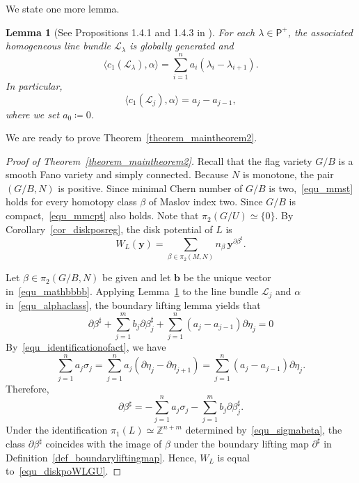 \documentclass[11pt]{amsart}
\theoremstyle{plain}
\newtheorem{lemma}[theorem]{Lemma}
\theoremstyle{definition}
\theoremstyle{remark}
\newcommand{\Z}{\mathbb{Z}}
\numberwithin{equation}{section} \numberwithin{table}{section}
\numberwithin{equation}{section}
\begin{document}
We state one more lemma.

\begin{lemma}[See Propositions 1.4.1 and 1.4.3 in \cite{Bri04}] \label{lemma_chernnumbercal}
For each $\lambda \in \mathsf{P}^+$, the associated homogeneous line bundle $\mathcal{L}_\lambda$ is globally generated and
$$
\langle c_1(\mathcal{L}_\lambda) , \alpha \rangle = \sum_{i=1}^n a_i (\lambda_i - \lambda_{i+1}).
$$
In particular, 
$$
\langle c_1(\mathcal{L}_j) , \alpha \rangle = a_j - a_{j-1},
$$
where we set $a_0 \coloneqq 0$.
\end{lemma}

We are ready to prove Theorem~\ref{theorem_maintheorem2}.

\begin{proof}[Proof of Theorem~\ref{theorem_maintheorem2}]
Recall that the flag variety $G/B$ is a smooth Fano variety and simply connected. Because $N$ is monotone, the pair $(G/B, N)$ is positive. Since minimal Chern number of $G/B$ is two,~\eqref{equ_mmst} holds for every homotopy class $\beta$ of Maslov index two. Since $G/B$ is compact,~\eqref{equ_mmcpt} also holds. Note that $\pi_2(G/U) \simeq \{0\}$. By Corollary~\ref{cor_diskposreg}, the disk potential of $L$ is 
$$
W_L (\mathbf{y}) = \sum_{\beta \in \pi_2(M,N)} n_\beta \, \mathbf{y}^{\partial \beta^\sharp}.
$$

Let $\beta\in\pi_2(G/B,N)$ be given and let $\mathbf{b}$ be the unique vector in~\eqref{equ_mathbbbb}. Applying Lemma~\ref{lemma_chernnumbercal} to the line bundle $\mathcal{L}_j$ and $\alpha$ in~\eqref{equ_alphaclass}, the boundary lifting lemma yields that
$$
\partial \beta^\sharp + \sum_{j=1}^m b_j \partial \beta_j^\sharp + \sum_{j=1}^{n} (a_j - a_{j-1}) \partial \eta_j = 0
$$
By~\eqref{equ_identificationofact}, we have
$$
\sum_{j=1}^n a_j \sigma_j = \sum_{j=1}^n a_j (\partial \eta_{j} - \partial \eta_{j+1}) =   \sum_{j=1}^{n} (a_j - a_{j-1}) \partial \eta_j.
$$
Therefore, 
\begin{equation}\label{equ_linearcomofpartialbeta}
\partial \beta^\sharp = - \sum_{j=1}^n a_j \sigma_j - \sum_{j=1}^m b_j \partial \beta_j^\sharp.
\end{equation}
Under the identification $\pi_1(L) \simeq \Z^{n+m}$ determined by~\eqref{equ_sigmabeta}, the class $\partial \beta^\sharp$ coincides with the image of $\beta$ under the boundary lifting map $\partial^\sharp$ in Definition~\ref{def_boundaryliftingmap}. Hence, $W_L$ is equal to~\eqref{equ_diskpoWLGU}.
\end{proof}
\end{document}
